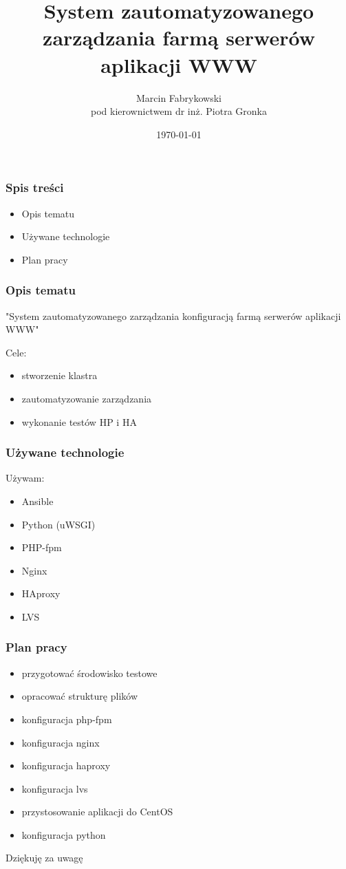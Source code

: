 \documentclass[12pt]{beamer}
\author{Marcin Fabrykowski\\pod kierownictwem dr inż. Piotra Gronka}
\title{System zautomatyzowanego zarządzania farmą serwerów aplikacji WWW}
\date{\today}
\begin{document}
\titleframe[pl]
\begin{frame}
		\frametitle{Spis treści}
		\begin{itemize}
			\item Opis tematu
			\item Używane technologie
			\item Plan pracy
		\end{itemize}
\end{frame}
\begin{frame}
\frametitle{Opis tematu}
"System zautomatyzowanego zarządzania konfiguracją farmą serwerów aplikacji WWW"
\begin{block}{Cele:}
		\begin{itemize}[<+->]
		\item stworzenie klastra
		\item zautomatyzowanie zarządzania
		\item wykonanie testów HP i HA
		\end{itemize}
\end{block}
\end{frame}

\begin{frame}
\frametitle{Używane technologie}
\begin{block}{Używam:}
	\begin{itemize}[<+->]
	\item Ansible
	\item Python (uWSGI)
	\item PHP-fpm
	\item Nginx
	\item HAproxy
	\item LVS
	\end{itemize}
\end{block}
\end{frame}

\begin{frame}
\frametitle{Plan pracy}
\begin{itemize}[<+->]
\item przygotować środowisko testowe
\item opracować strukturę plików
\item konfiguracja php-fpm
\item konfiguracja nginx 
\item konfiguracja haproxy
\item konfiguracja lvs
\item przystosowanie aplikacji do CentOS
\item konfiguracja python
\end{itemize}
\end{frame}

\begin{frame}
\begin{center}
		Dziękuję za uwagę
\end{center}
\end{frame}
\end{document}
